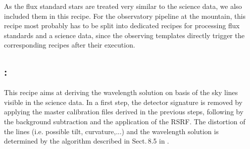 As the flux standard stars are treated very similar to the science
data, we also included them in this recipe. For the observatory
pipeline at the mountain, this recipe most probably has to be split
into dedicated recipes for processing flux standards and a science
data, since the observing templates directly trigger the corresponding
recipes after their execution.

\subsection{:}
This recipe aims at deriving the wavelength solution on basis of the sky lines visible in the science data. In a first step, the detector signature is removed by applying the master calibration files derived in the previous steps, following by the background subtraction and the application of the RSRF. The distortion of the lines (i.e. possible tilt, curvature,...) and the wavelength solution is determined by the algorithm described in Sect.\,8.5 in \cite{DRLS}.

